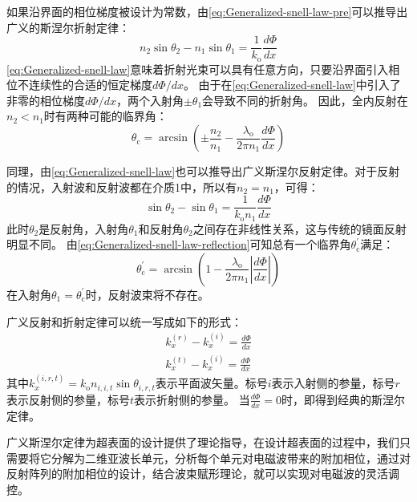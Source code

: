 \documentclass[supercite]{HustGraduPaper}
\begin{document}
如果沿界面的相位梯度被设计为常数，由\autoref{eq:Generalized-snell-law-pre}可以推导出广义的斯涅尔折射定律：
\begin{equation}
	n_2 \sin \theta_2 - n_1 \sin \theta_1 = \frac{1}{k_\mathrm{o}} \frac{d \Phi}{dx}
	\label{eq:Generalized-snell-law}
\end{equation}
\autoref{eq:Generalized-snell-law}意味着折射光束可以具有任意方向，只要沿界面引入相位不连续性的合适的恒定梯度$d\Phi/dx$。
由于在\autoref{eq:Generalized-snell-law}中引入了非零的相位梯度$d\Phi/dx$，两个入射角$\pm \theta_1$会导致不同的折射角。
因此，全内反射在$n_2<n_1$时有两种可能的临界角：
\begin{equation}
	\theta_{\mathrm{c}}=\arcsin \left(\pm \frac{n_{2}}{n_{1}}-\frac{\lambda_{\mathrm{o}}}{2 \pi n_{1}} \frac{d \Phi}{d x}\right)
\end{equation}

同理，由\autoref{eq:Generalized-snell-law}也可以推导出广义斯涅尔反射定律。对于反射的情况，入射波和反射波都在介质1中，所以有$n_2=n_1$，可得：
\begin{equation}
	\sin \theta_2 - \sin \theta_1 = \frac{1}{k_\mathrm{o} n_1} \frac{d \Phi}{dx}
	\label{eq:Generalized-snell-law-reflection}
\end{equation}
此时$\theta_2$是反射角，入射角$\theta_1$和反射角$\theta_2$之间存在非线性关系，这与传统的镜面反射明显不同。
由\autoref{eq:Generalized-snell-law-reflection}可知总有一个临界角$\theta_{\mathrm{c}}^{\prime}$满足：
\begin{equation}
	\theta_{\mathrm{c}}^{\prime}=\arcsin \left(1-\frac{\lambda_{\mathrm{o}}}{2 \pi n_{1}}\left|\frac{d \Phi}{d x}\right|\right)
\end{equation}
在入射角$\theta_1 = \theta_{\mathrm{c}}^{\prime}$时，反射波束将不存在。

广义反射和折射定律可以统一写成如下的形式\cite{ding2017gradient}：
\begin{eqnarray}
	k_{x}^{(r)}-k_{x}^{(i)}=\frac{d \Phi}{d x} \\
	k_{x}^{(t)}-k_{x}^{(i)}=\frac{d \Phi}{d x}
\end{eqnarray}
其中$k_{x}^{(i, r, t)}=k_{\mathrm{o}} n_{i, i, t} \sin \theta_{i, r, t}$表示平面波矢量。标号$i$表示入射侧的参量，标号$r$表示反射侧的参量，标号$t$表示折射侧的参量。
当$\frac{d \Phi}{d x}=0$时，即得到经典的斯涅尔定律。

广义斯涅尔定律为超表面的设计提供了理论指导，在设计超表面的过程中，我们只需要将它分解为二维亚波长单元，分析每个单元对电磁波带来的附加相位，通过对反射阵列的附加相位的设计，结合波束赋形理论，就可以实现对电磁波的灵活调控。
\end{document}
